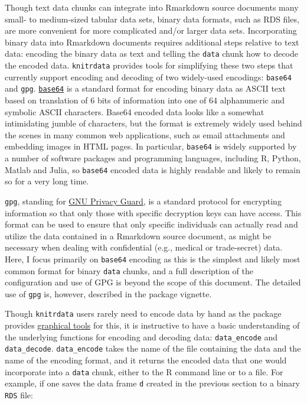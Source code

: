 Though text data chunks can integrate into Rmarkdown source documents many small- to medium-sized tabular data sets, binary data formats, such as RDS files, are more convenient for more complicated and/or larger data sets. Incorporating binary data into Rmarkdown documents requires additional steps relative to text data: encoding the binary data as text and telling the \texttt{data} chunk how to decode the encoded data. \texttt{knitrdata} provides tools for simplifying these two steps that currently support encoding and decoding of two widely-used encodings: \texttt{base64} and \texttt{gpg}. \href{https://en.wikipedia.org/wiki/Base64}{\texttt{base64}} is a standard format for encoding binary data as ASCII text based on translation of 6 bits of information into one of 64 alphanumeric and symbolic ASCII characters. Base64 encoded data looks like a somewhat intimidating jumble of characters, but the format is extremely widely used behind the scenes in many common web applications, such as email attachments and embedding images in HTML pages. In particular, \texttt{base64} is widely supported by a number of software packages and programming languages, including R, Python, Matlab and Julia, so \texttt{base64} encoded data is highly readable and likely to remain so for a very long time.

\texttt{gpg}, standing for \href{https://gnupg.org/}{GNU Privacy Guard}, is a standard protocol for encrypting information so that only those with specific decryption keys can have access. This format can be used to ensure that only specific individuals can actually read and utilize the data contained in a Rmarkdown source document, as might be necessary when dealing with confidential (e.g., medical or trade-secret) data. Here, I focus primarily on \texttt{base64} encoding as this is the simplest and likely most common format for binary \texttt{data} chunks, and a full description of the configuration and use of GPG is beyond the scope of this document. The detailed use of \texttt{gpg} is, however, described in the package vignette.

Though \texttt{knitrdata} users rarely need to encode data by hand as the package provides \protect\hyperlink{addins}{graphical tools} for this, it is instructive to have a basic understanding of the underlying functions for encoding and decoding data: \texttt{data\_encode} and \texttt{data\_decode}. \texttt{data\_encode} takes the name of the file containing the data and the name of the encoding format, and it returns the encoded data that one would incorporate into a \texttt{data} chunk, either to the R command line or to a file. For example, if one saves the data frame \texttt{d} created in the previous section to a binary \texttt{RDS} file:

